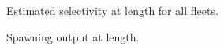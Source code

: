 \documentclass[
]{scrartcl}
\begin{document}
\clearpage

\begin{figure}


\caption{\label{fig-selex_allfleets}Estimated selectivity at length for
all fleets.}

\end{figure}%

\begin{figure}


\caption{\label{fig-spoutlen}Spawning output at length.}

\end{figure}%
\end{document}
